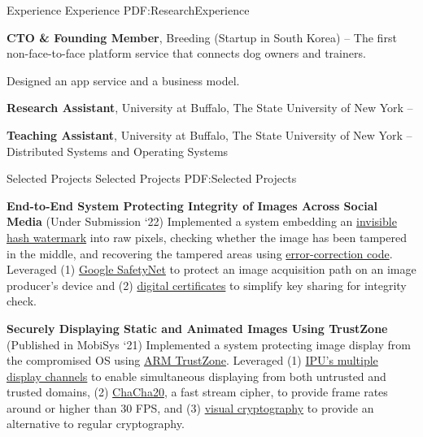 \documentclass[letterpaper,MMMyyyy,nonstopmode]{simpleresumecv}
\begin{document}
\begin{Body}
\vspace{-0.7ex}
\Section
{Experience}
{Experience}
{PDF:ResearchExperience}


\Entry
\textbf{CTO \& Founding Member}, Breeding (Startup in South Korea)
\hfill
{} --
\Gap
\BulletItem
The first non-face-to-face platform service that connects dog owners and trainers.
\hfill

\Gap
\BulletItem
Designed an app service and a business model.

\Gap
\vspace{1ex}

\Entry
\textbf{Research Assistant}, University at Buffalo, The State University of New York
\hfill
{} --

\vspace{0.5ex}
\Entry
\textbf{Teaching Assistant}, University at Buffalo, The State University of New York
\hfill
{} --
\Gap
\BulletItem
Distributed Systems and Operating Systems 



\vspace{-0.7ex}
\Section
{Selected Projects}
{Selected Projects}
{PDF:Selected Projects}

\Entry
\textbf{End-to-End System Protecting Integrity of Images Across Social Media} 
(Under Submission `22)
\Gap
\BulletItem
Implemented a system embedding an \underline{invisible hash watermark} into raw 
pixels, checking whether the image has been tampered in the middle, and 
recovering the tampered areas using \underline{error-correction code}.
\BulletItem
Leveraged (1) \underline{Google SafetyNet} to protect an image acquisition path 
on an image producer's device and (2) \underline{digital certificates} to 
simplify key sharing for integrity check. 

\vspace{1ex}
\Entry
\textbf{Securely Displaying Static and Animated Images Using TrustZone} 
(Published in MobiSys `21)
\Gap
\BulletItem
Implemented a system protecting image display from the compromised OS using 
\underline{ARM TrustZone}.
\BulletItem
Leveraged (1) \underline{IPU's multiple display channels} to enable simultaneous 
displaying from both untrusted and trusted domains, (2) \underline{ChaCha20}, 
a fast stream cipher, to provide frame rates around or higher than 30 FPS, 
and (3) \underline{visual cryptography} to provide an alternative to regular 
cryptography.


\end{Body}
\end{document}
